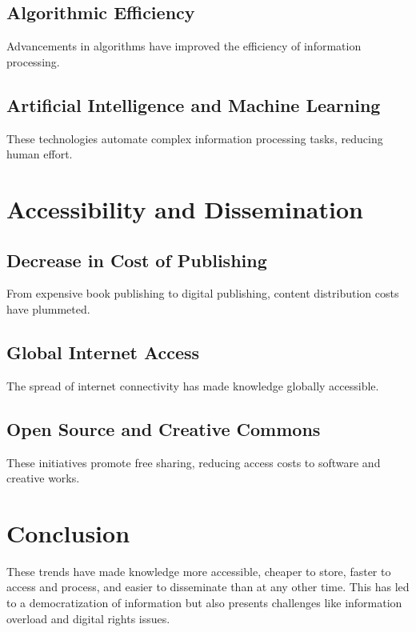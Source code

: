 \documentclass[12pt,titlepage]{book}
\begin{document}
\subsection{Algorithmic Efficiency}
Advancements in algorithms have improved the efficiency of information processing.

\subsection{Artificial Intelligence and Machine Learning}
These technologies automate complex information processing tasks, reducing human effort.

\section{Accessibility and Dissemination}

\subsection{Decrease in Cost of Publishing}
From expensive book publishing to digital publishing, content distribution costs have plummeted.

\subsection{Global Internet Access}
The spread of internet connectivity has made knowledge globally accessible.

\subsection{Open Source and Creative Commons}
These initiatives promote free sharing, reducing access costs to software and creative works.

\section{Conclusion}

These trends have made knowledge more accessible, cheaper to store, faster to access and process, and easier to disseminate than at any other time. This has led to a democratization of information but also presents challenges like information overload and digital rights issues.
\end{document}
